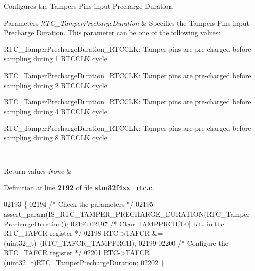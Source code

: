 Configures the Tampers Pins input Precharge Duration. 


\begin{DoxyParams}{Parameters}
{\em R\+T\+C\+\_\+\+Tamper\+Precharge\+Duration} & Specifies the Tampers Pins input Precharge Duration. This parameter can be one of the following values\+: \begin{DoxyItemize}
\item R\+T\+C\+\_\+\+Tamper\+Precharge\+Duration\+\_\+R\+T\+C\+C\+LK\+: Tamper pins are pre-\/charged before sampling during 1 R\+T\+C\+C\+LK cycle \item R\+T\+C\+\_\+\+Tamper\+Precharge\+Duration\+\_\+R\+T\+C\+C\+LK\+: Tamper pins are pre-\/charged before sampling during 2 R\+T\+C\+C\+LK cycle \item R\+T\+C\+\_\+\+Tamper\+Precharge\+Duration\+\_\+R\+T\+C\+C\+LK\+: Tamper pins are pre-\/charged before sampling during 4 R\+T\+C\+C\+LK cycle \item R\+T\+C\+\_\+\+Tamper\+Precharge\+Duration\+\_\+R\+T\+C\+C\+LK\+: Tamper pins are pre-\/charged before sampling during 8 R\+T\+C\+C\+LK cycle \end{DoxyItemize}
\\
\hline
\end{DoxyParams}

\begin{DoxyRetVals}{Return values}
{\em None} & \\
\hline
\end{DoxyRetVals}


Definition at line \textbf{ 2192} of file \textbf{ stm32f4xx\+\_\+rtc.\+c}.


\begin{DoxyCode}
02193 \{
02194   \textcolor{comment}{/* Check the parameters */}
02195   assert_param(IS_RTC_TAMPER_PRECHARGE_DURATION(RTC\_TamperPrechargeDuration));
02196    
02197   \textcolor{comment}{/* Clear TAMPPRCH[1:0] bits in the RTC\_TAFCR register */}
02198   RTC->TAFCR &= (uint32\_t)~(RTC_TAFCR_TAMPPRCH);
02199 
02200   \textcolor{comment}{/* Configure the RTC\_TAFCR register */}
02201   RTC->TAFCR |= (uint32\_t)RTC\_TamperPrechargeDuration;
02202 \}
\end{DoxyCode}
\mbox{\label{group__RTC__Group9_ga981b9c654e521282a2020a81118c8c3c}} 
